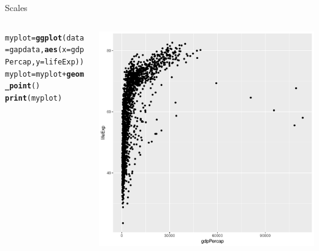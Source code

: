 \documentclass[aspectratio=169]{beamer}\usepackage[]{graphicx}\usepackage[]{color}
\makeatletter
\def\maxwidth{ %
  \ifdim\Gin@nat@width>\linewidth
    \linewidth
  \else
    \Gin@nat@width
  \fi
}
\newcommand{\hlopt}[1]{\textcolor[rgb]{0,0,0}{#1}}%
\newcommand{\hlstd}[1]{\textcolor[rgb]{0.345,0.345,0.345}{#1}}%
\newcommand{\hlkwb}[1]{\textcolor[rgb]{0.69,0.353,0.396}{#1}}%
\newcommand{\hlkwc}[1]{\textcolor[rgb]{0.333,0.667,0.333}{#1}}%
\newcommand{\hlkwd}[1]{\textcolor[rgb]{0.737,0.353,0.396}{\textbf{#1}}}%
\newenvironment{kframe}{%
 \def\at@end@of@kframe{}%
 \ifinner\ifhmode%
  \def\at@end@of@kframe{\end{minipage}}%
  \begin{minipage}{\columnwidth}%
 \fi\fi%
 \def\FrameCommand##1{\hskip\@totalleftmargin \hskip-\fboxsep
 \colorbox{shadecolor}{##1}\hskip-\fboxsep
     \hskip-\linewidth \hskip-\@totalleftmargin \hskip\columnwidth}%
 \MakeFramed {\advance\hsize-\width
   \@totalleftmargin\z@ \linewidth\hsize
   \@setminipage}}%
 {\par\unskip\endMakeFramed%
 \at@end@of@kframe}
\newenvironment{knitrout}{}{} %
\makeatother
\begin{document}
\begin{frame}[fragile]{Scales}
\begin{columns}
  \begin{column}{0.50\textwidth}
\begin{knitrout}\tiny
{}\color{fgcolor}\begin{kframe}
\begin{alltt}
\hlstd{myplot} \hlkwb{=} \hlkwd{ggplot}\hlstd{(}\hlkwc{data}\hlstd{=gapdata,} \hlkwd{aes}\hlstd{(}\hlkwc{x}\hlstd{=gdpPercap,} \hlkwc{y}\hlstd{=lifeExp))}
\hlstd{myplot} \hlkwb{=} \hlstd{myplot} \hlopt{+} \hlkwd{geom_point}\hlstd{()}
\hlkwd{print}\hlstd{(myplot)}
\end{alltt}
\end{kframe}
\end{knitrout}
  \end{column}
  \begin{column}{0.5\textwidth}
\begin{knitrout}\scriptsize
{}\color{fgcolor}
\includegraphics[width=\maxwidth]{figure/unnamed-chunk-23-1} 

\end{knitrout}
  \end{column}
\end{columns}
\end{frame}
\end{document}
